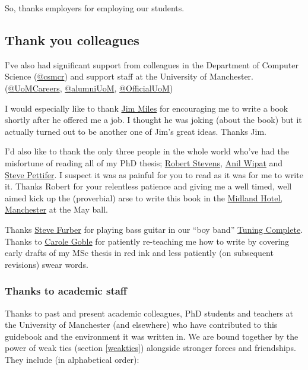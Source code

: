 \documentclass[
]{book}
\begin{document}
So, thanks employers for employing our students. 🙏

\hypertarget{colleagues}{%
\subsection{Thank you colleagues}\label{colleagues}}

I've also had significant support from colleagues in the Department of Computer Science (\href{https://twitter.com/csmcr}{@csmcr}) and support staff at the University of Manchester. (\href{https://twitter.com/UoMCareers}{@UoMCareers}, \href{https://twitter.com/alumniUoM}{@alumniUoM}, \href{https://twitter.com/OfficialUoM}{@OfficialUoM})

I would especially like to thank \href{https://en.wikipedia.org/wiki/James_John_Miles}{Jim Miles} for encouraging me to write a book shortly after he offered me a job. I thought he was joking (about the book) but it actually turned out to be another one of Jim's great ideas. Thanks Jim. 🙏

I'd also like to thank the only three people in the whole world who've had the misfortune of reading all of my PhD thesis; \href{https://en.wikipedia.org/wiki/Robert_David_Stevens}{Robert Stevens}, \href{https://www.ncl.ac.uk/computing/staff/profile/anilwipat.html}{Anil Wipat} and \href{https://en.wikipedia.org/wiki/Steve_Pettifer}{Steve Pettifer}. I suspect it was as painful for you to read as it was for me to write it. Thanks Robert for your relentless patience and giving me a well timed, well aimed kick up the (proverbial) arse to write this book in the \href{https://en.wikipedia.org/wiki/Midland_Hotel,_Manchester}{Midland Hotel, Manchester} at the May ball.

Thanks \href{https://en.wikipedia.org/wiki/Steve_Furber}{Steve Furber} for playing bass guitar in our ``boy band'' \href{http://www.cs.man.ac.uk/~hulld/research.html\#tuningcomplete}{Tuning Complete}. Thanks to \href{https://en.wikipedia.org/wiki/Carole_Goble}{Carole Goble} for patiently re-teaching me how to write by covering early drafts of my MSc thesis in red ink and less patiently (on subsequent revisions) swear words. 🤬

\hypertarget{academia}{%
\subsubsection{Thanks to academic staff}\label{academia}}

Thanks to past and present academic colleagues, PhD students and teachers at the University of Manchester (and elsewhere) who have contributed to this guidebook and the environment it was written in. We are bound together by the power of weak ties (section \ref{weakties}) alongside stronger forces and friendships. They include (in alphabetical order):
\end{document}
